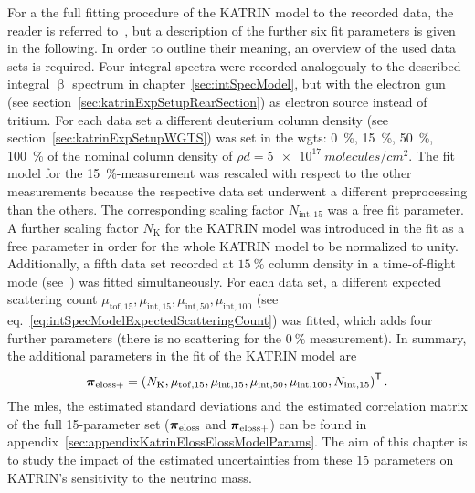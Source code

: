 For a the full fitting procedure of the KATRIN model to the recorded data, the reader is referred to~\cite{Hannen2019_1}, but a description of the further six fit parameters is given in the following. In order to outline their meaning, an overview of the used data sets is required. Four integral spectra were recorded analogously to the described integral $\upbeta$ spectrum in chapter~\ref{sec:intSpecModel}, but with the electron gun (see section~\ref{sec:katrinExpSetupRearSection}) as electron source instead of tritium. For each data set a different deuterium column density (see section~\ref{sec:katrinExpSetupWGTS}) was set in the \gls{wgts}: \SI{0}{\percent}, \SI{15}{\percent}, \SI{50}{\percent}, \SI{100}{\percent} of the nominal column density of $\rho d = \SI{5e17}{molecules/cm^2}$. The fit model for the \mbox{\SI{15}{\percent}-measurement} was rescaled with respect to the other measurements because the respective data set underwent a different preprocessing than the others. The corresponding scaling factor $N_{\mathrm{int},15}$ was a free fit parameter. A further scaling factor $N_\mathrm{K}$ for the KATRIN model was introduced in the fit as a free parameter in order for the whole KATRIN model to be normalized to unity. Additionally, a fifth data set recorded at $\SI{15}{\percent}$ column density in a time-of-flight mode (see~\cite{Bonn1999}) was fitted simultaneously. For each data set, a different expected scattering count $
\mu_{\mathrm{tof},15}, 
\mu_{\mathrm{int},15},  
\mu_{\mathrm{int},50},  
\mu_{\mathrm{int},100}$ (see eq.~\ref{eq:intSpecModelExpectedScatteringCount}) was fitted, which adds four further parameters (there is no scattering for the $\SI{0}{\percent}$ measurement). In summary, the additional parameters in the fit of the KATRIN model are
\begin{equation}
\label{eq:katrinElossElossModelExtendedParams}
	\boldsymbol{\mathbf{\pi}}_\mathrm{eloss+} = 
	{\left(
		N_\mathrm{K},
		\mu_{\mathrm{tof},15},
		\mu_{\mathrm{int},15}, 
		\mu_{\mathrm{int},50}, 
		\mu_{\mathrm{int},100},
		N_{\mathrm{int},15}
		\right)}^{\mathsf{T}}
	\text{\,.}
\end{equation}
The \gls{mle}s, the estimated standard deviations and the estimated correlation matrix of the full 15-parameter set ($\boldsymbol{\mathbf{\pi}}_\mathrm{eloss}$ and $\boldsymbol{\mathbf{\pi}}_\mathrm{eloss+}$) can be found in appendix~\ref{sec:appendixKatrinElossElossModelParams}. The aim of this chapter is to study the impact of the estimated uncertainties from these 15 parameters on KATRIN's sensitivity to the neutrino mass.

